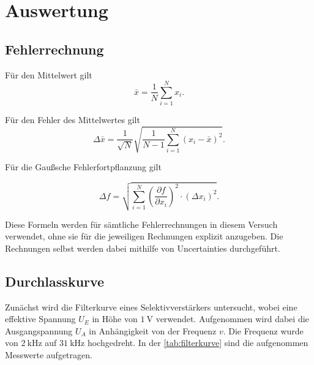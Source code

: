 \section{Auswertung}
\label{sec:auswertung}

\subsection{Fehlerrechnung}
\label{sec:Fehlerrechnung}

    Für den Mittelwert gilt
    \begin{equation}
    \bar{x} = \frac{1}{N}\sum\limits_{i = 1}^N x_i .
    \end{equation}

    Für den Fehler des Mittelwertes gilt
    \begin{equation}
        \Delta \bar{x}=\frac{1}{\sqrt{N}} \sqrt{\frac{1}{N-1} \sum_{i=1}^N\left(x_i-\bar{x}\right)^2}.
        \label{eqn:mittelwert}
        \end{equation}

    Für die Gaußsche Fehlerfortpflanzung gilt

    \begin{equation}
        \Delta f=\sqrt{\sum_{i=1}^N\left(\frac{\partial f}{\partial x_i}\right)^2 \cdot\left(\Delta x_i\right)^2}.
    \end{equation}

    Diese Formeln werden für sämtliche Fehlerrechnungen in diesem Versuch verwendet, ohne sie für die 
    jeweiligen Rechnungen explizit anzugeben. Die Rechnungen selbst werden dabei mithilfe von
    Uncertainties durchgeführt.

\subsection{Durchlasskurve}
\label{sec:Durchlasskurve}

Zunächst wird die Filterkurve eines Selektivverstärkers untersucht, wobei eine effektive Spannung $U_E$ in Höhe von $ \SI{1}{\volt}$ 
verwendet. Aufgenommen wird dabei die Ausgangspannung $U_A$ in Anhängigkeit von der Frequenz $v$. Die Frequenz wurde von $\SI{2}{\kHz}$ auf 
$\SI{31}{\kHz}$ hochgedreht. In der \eqref{tab:filterkurve} sind die aufgenommen Messwerte aufgetragen.

